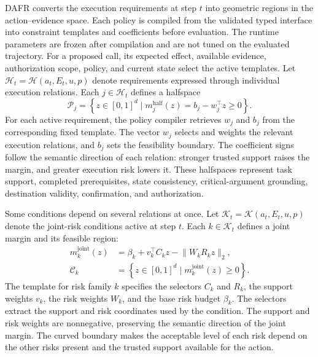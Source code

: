 \documentclass[letterpaper]{article}
\begin{document}
DAFR converts the execution requirements at step $t$ into geometric regions in the action--evidence space. Each policy is compiled from the validated typed interface into constraint templates and coefficients before evaluation. The runtime parameters are frozen after compilation and are not tuned on the evaluated trajectory. For a proposed call, its expected effect, available evidence, authorization scope, policy, and current state select the active templates. Let $\mathcal H_t=\mathcal H(a_t,E_t,u,p)$ denote requirements expressed through individual execution relations. Each $j\in\mathcal H_t$ defines a halfspace
\begin{equation}
 \mathcal P_j=\left\{z\in[0,1]^d\mid m_j^{\mathrm{half}}(z)=b_j-w_j^\top z\geq0\right\}.
 \label{eq:halfspace}
\end{equation}
For each active requirement, the policy compiler retrieves $w_j$ and $b_j$ from the corresponding fixed template. The vector $w_j$ selects and weights the relevant execution relations, and $b_j$ sets the feasibility boundary. The coefficient signs follow the semantic direction of each relation: stronger trusted support raises the margin, and greater execution risk lowers it. These halfspaces represent task support, completed prerequisites, state consistency, critical-argument grounding, destination validity, confirmation, and authorization.

Some conditions depend on several relations at once. Let $\mathcal K_t=\mathcal K(a_t,E_t,u,p)$ denote the joint-risk conditions active at step $t$. Each $k\in\mathcal K_t$ defines a joint margin and its feasible region:
\begin{equation}
\begin{aligned}
 m_k^{\mathrm{joint}}(z)&=\beta_k+v_k^\top C_kz-\lVert W_kR_kz\rVert_2,\\
 \mathcal C_k&=\left\{z\in[0,1]^d\mid m_k^{\mathrm{joint}}(z)\geq0\right\}.
\end{aligned}
 \label{eq:joint-region}
\end{equation}
The template for risk family $k$ specifies the selectors $C_k$ and $R_k$, the support weights $v_k$, the risk weights $W_k$, and the base risk budget $\beta_k$. The selectors extract the support and risk coordinates used by the condition. The support and risk weights are nonnegative, preserving the semantic direction of the joint margin. The curved boundary makes the acceptable level of each risk depend on the other risks present and the trusted support available for the action.
\end{document}
